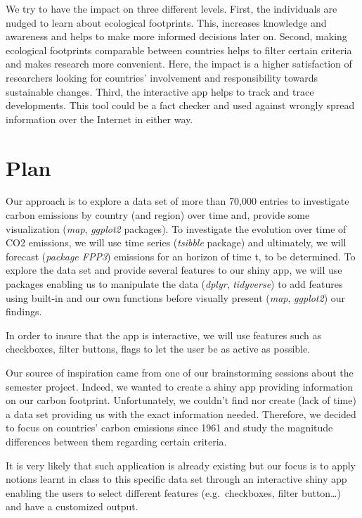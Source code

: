 \documentclass[
]{article}
\begin{document}
We try to have the impact on three different levels. First, the
individuals are nudged to learn about ecological footprints. This,
increases knowledge and awareness and helps to make more informed
decisions later on. Second, making ecological footprints comparable
between countries helps to filter certain criteria and makes research
more convenient. Here, the impact is a higher satisfaction of
researchers looking for countries' involvement and responsibility
towards sustainable changes. Third, the interactive app helps to track
and trace developments. This tool could be a fact checker and used
against wrongly spread information over the Internet in either way.

\hypertarget{plan}{%
\section{Plan}\label{plan}}

Our approach is to explore a data set of more than 70,000 entries to
investigate carbon emissions by country (and region) over time and,
provide some visualization (\emph{map}, \emph{ggplot2} packages). To
investigate the evolution over time of CO2 emissions, we will use time
series (\emph{tsibble} package) and ultimately, we will forecast
(\emph{package FPP3}) emissions for an horizon of time t, to be
determined. To explore the data set and provide several features to our
shiny app, we will use packages enabling us to manipulate the data
(\emph{dplyr}, \emph{tidyverse}) to add features using built-in and our
own functions before visually present (\emph{map}, \emph{ggplot2}) our
findings.

In order to insure that the app is interactive, we will use features
such as checkboxes, filter buttons, flags to let the user be as active
as possible.

Our source of inspiration came from one of our brainstorming sessions
about the semester project. Indeed, we wanted to create a shiny app
providing information on our carbon footprint. Unfortunately, we
couldn't find nor create (lack of time) a data set providing us with the
exact information needed. Therefore, we decided to focus on countries'
carbon emissions since 1961 and study the magnitude differences between
them regarding certain criteria.

It is very likely that such application is already existing but our
focus is to apply notions learnt in class to this specific data set
through an interactive shiny app enabling the users to select different
features (e.g.~checkboxes, filter button\ldots) and have a customized
output.
\end{document}
